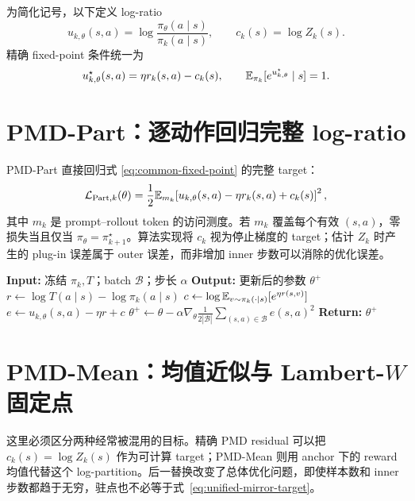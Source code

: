 为简化记号，以下定义 log-ratio
\[
 u_{k,\theta}(s,a)=\log\frac{\pi_\theta(a\mid s)}{\pi_k(a\mid s)},
 \qquad
 c_k(s)=\log Z_k(s).
\]
精确 fixed-point 条件统一为
\begin{equation}
\label{eq:common-fixed-point}
 u_{k,\theta}^{\star}(s,a)=\eta r_k(s,a)-c_k(s),
 \qquad
 \mathbb{E}_{\pi_k}[e^{u_{k,\theta}^{\star}}\mid s]=1.
\end{equation}

\section{PMD-Part：逐动作回归完整 log-ratio}
\label{sec:pmd-part-unified}

PMD-Part 直接回归式 \eqref{eq:common-fixed-point} 的完整 target：
\begin{equation}
\label{eq:pmd-part-objective}
 \mathcal L_{\mathrm{Part},k}(\theta)
 =\frac12\mathbb{E}_{m_k}\!\left[
 u_{k,\theta}(s,a)-\eta r_k(s,a)+c_k(s)
 \right]^2,
\end{equation}
其中 $m_k$ 是 prompt--rollout token 的访问测度。若 $m_k$ 覆盖每个有效 $(s,a)$，零损失当且仅当 $\pi_\theta=\pi_{k+1}^{\star}$。算法实现将 $c_k$ 视为停止梯度的 target；估计 $Z_k$ 时产生的 plug-in 误差属于 outer 误差，而非增加 inner 步数可以消除的优化误差。

\begin{algorithm}
\caption{PMD-Part inner update\\{\small\textit{Semantics: 根据完整 log-ratio target 重构}}}
\begin{algorithmic}
\STATE \textbf{Input:} 冻结 $\pi_k,T$；batch $\mathcal B$；步长 $\alpha$
\STATE \textbf{Output:} 更新后的参数 $\theta^+$
    \STATE $r\gets\log T(a\mid s)-\log\pi_k(a\mid s)$
    \STATE $c\gets\log\mathbb{E}_{v\sim\pi_k(\cdot\mid s)}[e^{\eta r(s,v)}]$
    \STATE $e\gets u_{k,\theta}(s,a)-\eta r+c$
\ENDFOR
\STATE $\theta^+\gets\theta-\alpha\nabla_\theta\frac{1}{2|\mathcal B|}\sum_{(s,a)\in\mathcal B}e(s,a)^2$
\STATE \textbf{Return:} $\theta^+$
\end{algorithmic}
\end{algorithm}

\section{PMD-Mean：均值近似与 Lambert-$W$ 固定点}
\label{sec:pmd-mean-unified}

这里必须区分两种经常被混用的目标。精确 PMD residual 可以把
$c_k(s)=\log Z_k(s)$ 作为可计算 target；PMD-Mean 则用 anchor 下的 reward
均值代替这个 log-partition。后一替换改变了总体优化问题，即使样本数和 inner
步数都趋于无穷，驻点也不必等于式~\eqref{eq:unified-mirror-target}。

